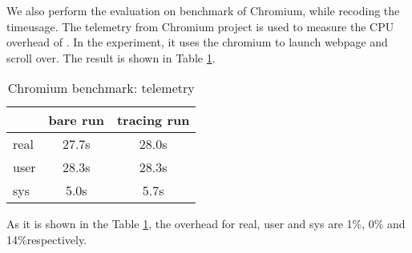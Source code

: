 We also perform the evaluation on benchmark of Chromium, while recoding the timeusage.
The telemetry from Chromium project is used to measure the CPU overhead of \xxx.
In the experiment, it uses the chromium to launch webpage and scroll over.
The result is shown in Table \ref{tab:chromium benchmark}. 
\begin{table}[h]
\begin{tabular}{l|c|c}
\hline
 & bare run & tracing run \\
\hline
real & 27.7s & 28.0s \\
\hline
user & 28.3s & 28.3s \\
\hline
sys &  5.0s & 5.7s\\
\hline
\end{tabular}
\caption{Chromium benchmark: telemetry}
\label{tab:chromium benchmark}
\end{table}

As it is shown in the Table \ref{tab:chromium benchmark}, the overhead for real, user and sys are 1\%, 0\% and
14\%respectively.

